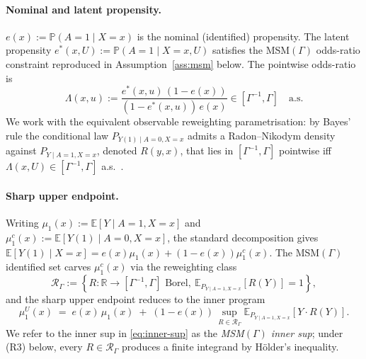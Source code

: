 \documentclass[11pt]{article}
\newcommand{\E}{\mathbb{E}}
\renewcommand{\Pr}{\mathbb{P}}
\newcommand{\R}{\mathbb{R}}
\theoremstyle{definition}
\theoremstyle{plain}
\theoremstyle{remark}
\begin{document}
\paragraph{Nominal and latent propensity.} $e(x) := \Pr(A=1 \mid X=x)$ is the nominal (identified) propensity. The latent propensity $e^*(x, U) := \Pr(A=1 \mid X=x, U)$ satisfies the MSM$(\Gamma)$ odds-ratio constraint reproduced in Assumption~\ref{ass:msm} below. The pointwise odds-ratio is
\[ \Lambda(x, u) := \frac{e^*(x, u)\,(1-e(x))}{(1-e^*(x,u))\,e(x)} \in [\Gamma^{-1}, \Gamma] \quad \text{a.s.} \]
We work with the equivalent observable reweighting parametrisation: by Bayes' rule the conditional law $P_{Y(1) \mid A=0, X=x}$ admits a Radon--Nikodym density against $P_{Y \mid A=1, X=x}$, denoted $R(y, x)$, that lies in $[\Gamma^{-1}, \Gamma]$ pointwise iff $\Lambda(x, U) \in [\Gamma^{-1}, \Gamma]$ a.s.\ \citep[Lemma~2]{Tan2006}.

\paragraph{Sharp upper endpoint.} Writing $\mu_1(x) := \E[Y \mid A=1, X=x]$ and $\mu_1^{c}(x) := \E[Y(1) \mid A=0, X=x]$, the standard decomposition gives $\E[Y(1) \mid X=x] = e(x) \mu_1(x) + (1-e(x)) \mu_1^{c}(x)$. The MSM$(\Gamma)$ identified set carves $\mu_1^{c}(x)$ via the reweighting class
\[ \mathcal{R}_\Gamma := \left\{ R : \R \to [\Gamma^{-1}, \Gamma] \text{ Borel}, \ \E_{P_{Y \mid A=1, X=x}}[R(Y)] = 1 \right\}, \]
and the sharp upper endpoint reduces to the inner program
\begin{equation}
  \mu_1^U(x) \;=\; e(x)\,\mu_1(x) \;+\; (1-e(x))\,\sup_{R \in \mathcal{R}_\Gamma} \E_{P_{Y \mid A=1, X=x}}[Y \cdot R(Y)]. \label{eq:inner-sup}
\end{equation}
We refer to the inner sup in \eqref{eq:inner-sup} as the \emph{MSM$(\Gamma)$ inner sup}; under (R3) below, every $R \in \mathcal{R}_\Gamma$ produces a finite integrand by H\"older's inequality.
\end{document}

